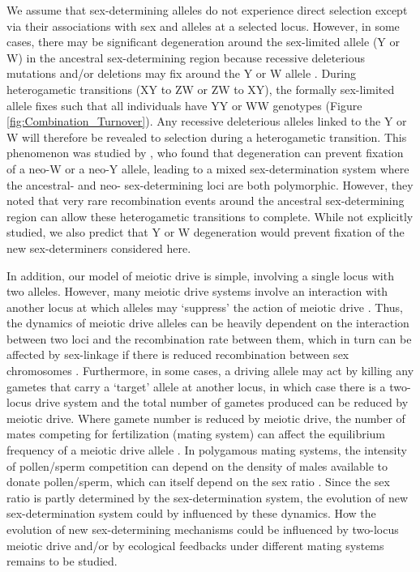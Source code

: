 \documentclass[12pt]{article}
\begin{document}
We assume that sex-determining alleles do not experience direct selection except via their associations with sex and alleles at a selected locus. 
However, in some cases, there may be significant degeneration around the sex-limited allele (Y or W) in the ancestral sex-determining region because recessive deleterious mutations and/or deletions may fix around the Y or W allele \citep{Rice:1996ke,Charlesworth:2000cc,Bachtrog:2006ed,Marais:2008hm}. 
During heterogametic transitions (XY to ZW or ZW to XY), the formally sex-limited allele fixes such that all individuals have YY or WW genotypes (Figure \ref{fig:Combination_Turnover}). 
Any recessive deleterious alleles linked to the Y or W will therefore be revealed to selection during a heterogametic transition. 
This phenomenon was studied by \citet{vanDoorn:2010hu}, who found that degeneration can prevent fixation of a neo-W or a neo-Y allele, leading to a mixed sex-determination system where the ancestral- and neo- sex-determining loci are both polymorphic. 
However, they noted that very rare recombination events around the ancestral sex-determining region can allow these heterogametic transitions to complete.  
While not explicitly studied, we also predict that Y or W degeneration would prevent fixation of the new sex-determiners considered here.

In addition, our model of meiotic drive is simple, involving a single locus with two alleles. 
However, many meiotic drive systems involve an interaction with another locus at which alleles may `suppress' the action of meiotic drive \citep[][]{Burt:2006,Lindholm:2016cw}.
Thus, the dynamics of meiotic drive alleles can be heavily dependent on the interaction between two loci and the recombination rate between them, which in turn can be affected by sex-linkage if there is reduced recombination between sex chromosomes \citep{Hurst:1991uh}.
Furthermore, in some cases, a driving allele may act by killing any gametes that carry a `target' allele at another locus, in which case there is a two-locus drive system and the total number of gametes produced can be reduced by meiotic drive. 
Where gamete number is reduced by meiotic drive, the number of mates competing for fertilization (mating system) can affect the equilibrium frequency of a meiotic drive allele \citep{Holman:2015en}. 
In polygamous mating systems, the intensity of pollen/sperm competition can depend on the density of males available to donate pollen/sperm, which can itself depend on the sex ratio \citep{Taylor:2002wu}. 
Since the sex ratio is partly determined by the sex-determination system, the evolution of new sex-determination system could by influenced by these dynamics. 
How the evolution of new sex-determining mechanisms could be influenced by two-locus meiotic drive and/or by ecological feedbacks under different mating systems remains to be studied.
\end{document}
